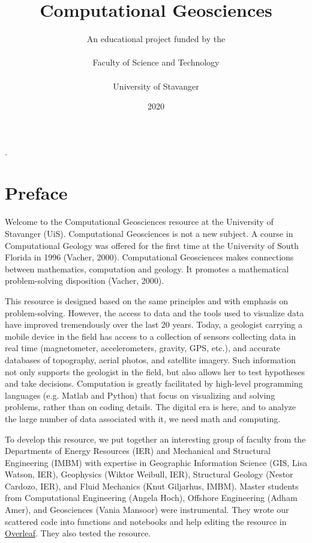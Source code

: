 \documentclass[a4paper , 12pt]{book}
\begin{document}

\lstset{style=mystyle}
\lstset{language=Python,upquote=true} %
\title{Computational Geosciences}
\author{An educational project funded by the \\ \\ Faculty of Science and Technology \\ \\ University of Stavanger}
\date{2020}

\setlength{\parindent}{0pt}.
\setlength{\parskip}{1em}
\renewcommand{\baselinestretch}{1.}

\maketitle
{}

\section*{Preface}

Welcome to the Computational Geosciences resource at the University of Stavanger (UiS). Computational Geosciences is not a new subject. A course in Computational Geology was offered for the first time at the University of South Florida in 1996 (Vacher, 2000). Computational Geosciences makes connections between mathematics, computation and geology. It promotes a mathematical problem-solving disposition (Vacher, 2000). 

This resource is designed based on the same principles and with emphasis on problem-solving. However, the access to data and the tools used to visualize data have improved tremendously over the last 20 years. Today, a geologist carrying a mobile device in the field has access to a collection of sensors collecting data in real time (magnetometer, accelerometers, gravity, GPS, etc.), and accurate databases of topography, aerial photos, and satellite imagery. Such information not only supports the geologist in the field, but also allows her to test hypotheses and take decisions. Computation is greatly facilitated by high-level programming languages (e.g. Matlab and Python) that focus on visualizing and solving problems, rather than on coding details. The digital era is here, and to analyze the large number of data associated with it, we need math and computing. 

To develop this resource, we put together an interesting group of faculty from the Departments of Energy Resources (IER) and Mechanical and Structural Engineering (IMBM) with expertise in Geographic Information Science (GIS, Lisa Watson, IER), Geophysics (Wiktor Weibull, IER), Structural Geology (Nestor Cardozo, IER), and Fluid Mechanics (Knut Giljarhus, IMBM). Master students from Computational Engineering (Angela Hoch), Offshore Engineering (Adham Amer), and Geosciences (Vania Mansoor) were instrumental. They wrote our scattered code into functions and notebooks and help editing the resource in \href {www.overleaf.com}{Overleaf}. They also tested the resource. 
\end{document}

